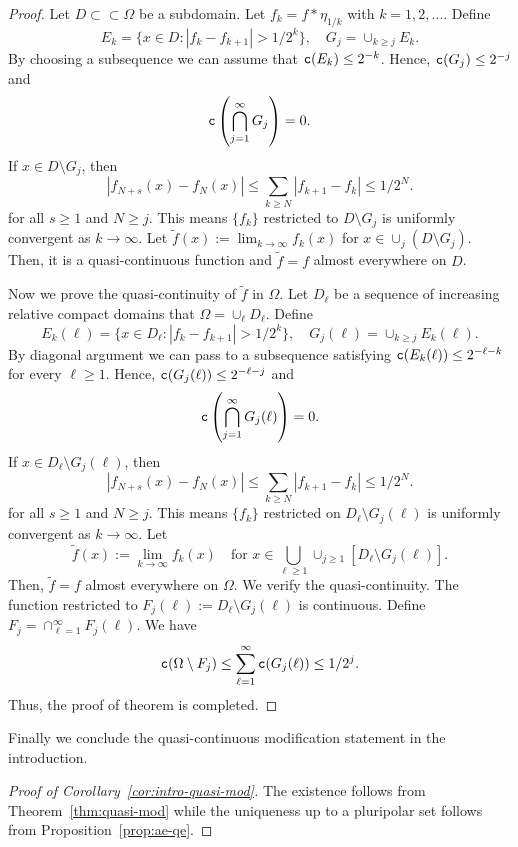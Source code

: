 \documentclass{amsart}
\newcommand{\wt}[1]{\widetilde{#1}}
\newcommand{\tc}{{\tt c}}
\newcommand{\Om}{\Omega}
\theoremstyle{definition}
\numberwithin{thm}{section}
\numberwithin{equation}{section}
\renewcommand{\[}{\begin{equation}}
\renewcommand{\]}{\end{equation}}
\begin{document}
\begin{proof} Let $D \subset \subset \Om$ be a subdomain. Let $f_k = f*\eta_{1/k}$ with $k=1,2,...$. Define 
$$
	E_k = \{x\in D: |f_k - f_{k+1}| >1/2^{k}\}, \quad
	G_j = \cup_{k\geq j} E_k.
$$ 
By choosing a subsequence we can assume that $\tc (E_k) \leq 2^{-k}$. Hence, $\tc(G_j) \leq 2^{-j}$ and 
$$
	\tc \left( \bigcap_{j=1}^\infty G_j \right) =0.
$$
If $x\in D\setminus G_j$, then 
$$
	|f_{N+s}(x) - f_N(x)| \leq \sum_{k\geq N} |f_{k+1} -f_k| \leq 1/2^N.
$$
for all $s \geq 1$ and $N\geq j$. 
This means $\{f_{k}\}$ restricted to $D\setminus G_j$ is uniformly convergent as $k\to \infty$. Let
$\wt f(x) :=\lim_{k\to \infty} f_k(x)$  for $x\in \cup_j (D\setminus G_j)$. Then, it is  a quasi-continuous function and $\wt f = f$ almost everywhere on $D$. 

Now we prove the quasi-continuity of $\wt f$ in $\Om$. Let $D_\ell$ be a sequence of increasing relative compact domains that $\Om = \cup_\ell D_\ell$.
Define 
$$
	E_k(\ell) = \{x\in D_\ell: |f_k - f_{k+1}| >1/2^{k}\}, \quad
	G_j (\ell)= \cup_{k\geq j} E_k(\ell).
$$ 
By diagonal argument we can pass to a subsequence satisfying  $\tc (E_k(\ell)) \leq 2^{-\ell - k}$ for every $\ell\geq 1$. Hence, $\tc(G_j(\ell)) \leq 2^{-\ell- j}$ and 
$$
	\tc \left( \bigcap_{j=1}^\infty G_j(\ell) \right) =0.
$$
If $x\in D_\ell\setminus G_j(\ell)$, then 
$$
	|f_{N+s}(x) - f_N(x)| \leq \sum_{k\geq N} |f_{k+1} -f_k| \leq 1/2^N.
$$
for all $s \geq 1$ and $N\geq j$. 
This means $\{f_{k}\}$ restricted on $D_\ell\setminus G_j(\ell)$ is uniformly convergent as $k\to \infty$. Let
\[\label{eq:quasi-continuity-def} \wt f(x) :=\lim_{k\to \infty} f_k(x) \quad   \text{for }
x\in \bigcup_{\ell\geq 1} \cup_{j\geq 1}[ D_\ell\setminus G_j (\ell)]. \]
Then, $\wt f = f$ almost everywhere on $\Om$. We verify the quasi-continuity.
The function restricted to 
$F_j(\ell) := D_\ell\setminus G_j(\ell)$ is continuous. Define $F_j = \cap_{\ell =1}^\infty F_j(\ell)$. We have 
$$
	\tc (\Om \setminus F_j) \leq \sum_{\ell=1}^\infty \tc (G_j(\ell)) \leq 1/2^{j}.
$$
Thus, the proof of theorem is completed.
\end{proof}

Finally we conclude the quasi-continuous modification statement in the introduction.

\begin{proof}[Proof of Corollary~\ref{cor:intro-quasi-mod}] The existence follows from Theorem~\ref{thm:quasi-mod} while the uniqueness up to a pluripolar set follows from Proposition~\ref{prop:ae-qe}.
\end{proof}
\end{document}
